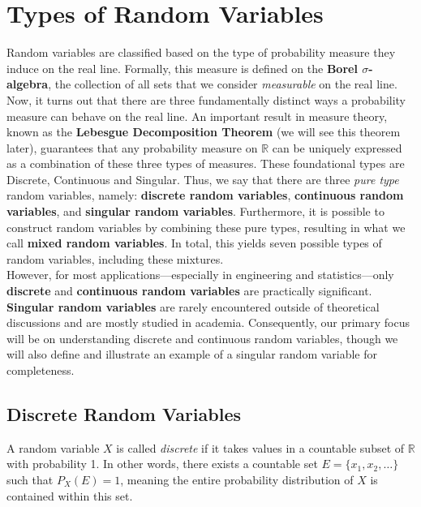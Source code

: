 \section{Types of Random Variables}

Random variables are classified based on the type of probability measure they induce on the real line. Formally, this measure is defined on the \textbf{Borel $\sigma$-algebra}, the collection of all sets that we consider \textit{measurable} on the real line. Now, it turns out that there are three fundamentally distinct ways a probability measure can behave on the real line. An important result in measure theory, known as the \textbf{Lebesgue Decomposition Theorem} (we will see this theorem later), guarantees that any probability measure on $\mathbb{R}$ can be uniquely expressed as a combination of these three types of measures. These foundational types are Discrete, Continuous and Singular. Thus, we say that there are three \textit{pure type} random variables, namely: \textbf{discrete random variables}, \textbf{continuous random variables}, and \textbf{singular random variables}. Furthermore, it is possible to construct random variables by combining these pure types, resulting in what we call \textbf{mixed random variables}. In total, this yields seven possible types of random variables, including these mixtures.\\

However, for most applications—especially in engineering and statistics—only \textbf{discrete} and \textbf{continuous random variables} are practically significant. \textbf{Singular random variables} are rarely encountered outside of theoretical discussions and are mostly studied in academia. Consequently, our primary focus will be on understanding discrete and continuous random variables, though we will also define and illustrate an example of a singular random variable for completeness.\\

\subsection{Discrete Random Variables}

\begin{definition}
    A random variable \( X \) is called \textit{discrete} if it takes values in a countable subset of \( \mathbb{R} \) with probability 1. In other words, there exists a countable set \( E = \{ x_1, x_2, \dots \} \) such that \( P_X(E) = 1 \), meaning the entire probability distribution of \( X \) is contained within this set. 
\end{definition}

